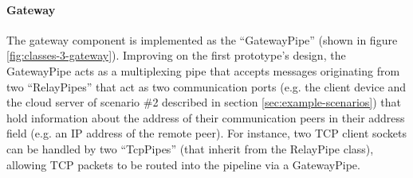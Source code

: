 \paragraph{Gateway} The gateway component is implemented as the \enquote{GatewayPipe} (shown in figure \ref{fig:classes-3-gateway}). Improving on the first prototype's design, the GatewayPipe acts as a multiplexing pipe that accepts messages originating from two \enquote{RelayPipes} that act as two communication ports (e.g. the client device and the cloud server of scenario \#2 described in section \ref{sec:example-scenarios}) that hold information about the address of their communication peers in their address field (e.g. an \ac{IP} address of the remote peer). For instance, two \ac{TCP} client sockets can be handled by two \enquote{TcpPipes} (that inherit from the RelayPipe class), allowing \ac{TCP} packets to be routed into the pipeline via a GatewayPipe.

